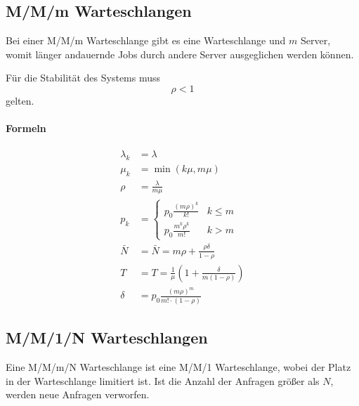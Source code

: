 		\subsection{M/M/m Warteschlangen} %
			Bei einer M/M/m Warteschlange gibt es eine Warteschlange und \(m\) Server, womit länger andauernde Jobs durch andere Server ausgeglichen werden können.

			Für die Stabilität des Systems muss \[ \rho < 1 \] gelten.

			\paragraph{Formeln}
				\begin{align*}
					\lambda _ k & = \lambda                                            \\
					\mu _ k     & = \min(k\mu, m\mu)                                   \\
					\rho        & = \frac{\lambda}{m\mu}                               \\
					p _ k       & = \begin{cases}
						                p _ 0 \frac{(m\rho) ^ k}{k!}    & k \leq m \\
						                p _ 0 \frac{m ^ k \rho ^ k}{m!} & k > m
					                \end{cases}         \\
					\bar{N}     & = \bar{N} = m\rho + \frac{\rho\delta}{1 - \rho}      \\
					T           & = T = \frac{1}{\mu} (1 + \frac{\delta}{m(1 - \rho)}) \\
					\delta      & = p _ 0 \frac{(m\rho) ^ m}{m! \cdot (1 - \rho)}
				\end{align*}

		\subsection{M/M/1/N Warteschlangen} %
			Eine M/M/m/N Warteschlange ist eine M/M/1 Warteschlange, wobei der Platz in der Warteschlange limitiert ist. Ist die Anzahl der Anfragen größer als \(N\), werden neue Anfragen verworfen.

